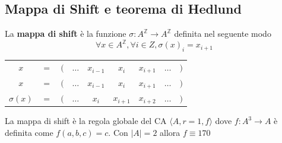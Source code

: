 \subsection{ Mappa di Shift e teorema di Hedlund}
\begin{definizione} 
    La \textbf{mappa di shift} è la funzione $\sigma:A^\mathbb{Z}\rightarrow A^\mathbb{Z}$
    definita nel seguente modo
    $$\forall x\in A^\mathbb{Z}, \forall i \in Z, \sigma(x)_i=x_{i+1}$$
    \begin{table}[!h]
        \centering
        \begin{tabular}{ccccccccc}
            $x$         & $=$ & $($ & $\dots$ & $x_{i-1}$ & $x_i$     & $x_{i+1}$ & $\dots$ & $)$ \\
            $x$         & $=$ & $($ & $\dots$ & $x_{i-1}$ & $x_i$     & $x_{i+1}$ & $\dots$ & $)$ \\
            $\sigma(x)$ & $=$ & $($ & $\dots$ & $x_{i}$   & $x_{i+1}$ & $x_{i+2}$ & $\dots$ & $)$
        \end{tabular}
    \end{table}
\end{definizione}

\begin{nota}
    La mappa di shift è la regola globale del CA $\langle A,r=1,f\rangle$ dove
    $f:A^3\rightarrow A$ è definita come $f(a,b,c) = c$. Con $|A|=2$ allora $f\equiv 170$

\end{nota}

